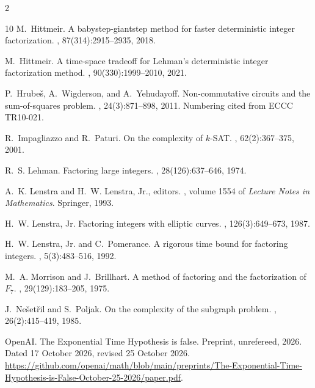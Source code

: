 \documentclass[11pt]{article}
\begin{document}
\begin{multicols}{2}
\begin{thebibliography}{10}
M.~Hittmeir.
\newblock A babystep-giantstep method for faster deterministic integer
  factorization.
, 87(314):2915--2935, 2018.

M.~Hittmeir.
\newblock A time-space tradeoff for {L}ehman's deterministic integer
  factorization method.
, 90(330):1999--2010, 2021.

P.~Hrube{\v{s}}, A.~Wigderson, and A.~Yehudayoff.
\newblock Non-commutative circuits and the sum-of-squares problem.
, 24(3):871--898,
  2011.
\newblock Numbering cited from ECCC TR10-021.

R.~Impagliazzo and R.~Paturi.
\newblock On the complexity of $k$-{SAT}.
, 62(2):367--375, 2001.

R.~S. Lehman.
\newblock Factoring large integers.
, 28(126):637--646, 1974.

A.~K. Lenstra and H.~W. Lenstra, Jr., editors.
, volume 1554 of {\em
  Lecture Notes in Mathematics}.
\newblock Springer, 1993.

H.~W. Lenstra, Jr.
\newblock Factoring integers with elliptic curves.
, 126(3):649--673, 1987.

H.~W. Lenstra, Jr. and C.~Pomerance.
\newblock A rigorous time bound for factoring integers.
, 5(3):483--516,
  1992.

M.~A. Morrison and J.~Brillhart.
\newblock A method of factoring and the factorization of {$F_7$}.
, 29(129):183--205, 1975.

J.~Ne{\v{s}}et{\v{r}}il and S.~Poljak.
\newblock On the complexity of the subgraph problem.
,
  26(2):415--419, 1985.

{OpenAI}.
\newblock The {E}xponential {T}ime {H}ypothesis is false.
\newblock Preprint, unrefereed, 2026.
\newblock Dated 17 October 2026, revised 25 October 2026.
  \url{https://github.com/openai/math/blob/main/preprints/The-Exponential-Time-Hypothesis-is-False-October-25-2026/paper.pdf}.


\end{thebibliography}
\end{multicols}
\end{document}
